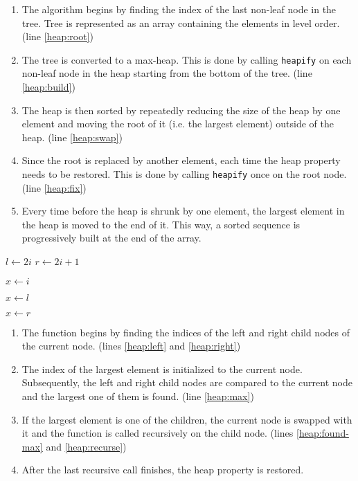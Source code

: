 \begin{enumerate}
    \item The algorithm begins by finding the index of the last non-leaf node in the tree. Tree is represented as an array containing the elements in level order. (line \ref{heap:root})
    \item The tree is converted to a max-heap. This is done by calling \texttt{heapify} on each non-leaf node in the heap starting from the bottom of the tree. (line \ref{heap:build})
    \item The heap is then sorted by repeatedly reducing the size of the heap by one element and moving the root of it (i.e. the largest element) outside of the heap. (line \ref{heap:swap})
    \item Since the root is replaced by another element, each time the heap property needs to be restored. This is done by calling \texttt{heapify} once on the root node. (line \ref{heap:fix})
    \item Every time before the heap is shrunk by one element, the largest element in the heap is moved to the end of it. This way, a sorted sequence is progressively built at the end of the array.
\end{enumerate}

\begin{algorithmic}[1]
        \State $l \gets 2i$ \label{heap:left}
        \State $r \gets 2i + 1$ \label{heap:right}

        \State $x \gets i$ \label{heap:max}
        
            \State $x \gets l$
        \EndIf
        
            \State $x \gets r$
        \EndIf
        
         \label{heap:found-max}
            \State {}
            \State {} \label{heap:recurse}
        \EndIf
    \EndFunction
\end{algorithmic}

\begin{enumerate}
    \item The function begins by finding the indices of the left and right child nodes of the current node. (lines \ref{heap:left} and \ref{heap:right})
    \item The index of the largest element is initialized to the current node. Subsequently, the left and right child nodes are compared to the current node and the largest one of them is found. (line \ref{heap:max})
    \item If the largest element is one of the children, the current node is swapped with it and the function is called recursively on the child node. (lines \ref{heap:found-max} and \ref{heap:recurse})
    \item After the last recursive call finishes, the heap property is restored.
\end{enumerate}

